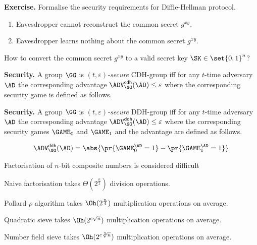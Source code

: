 \documentclass[landscape,footrule]{foils}
\newcommand{\lastline}{\vspace*{-2ex}}
\begin{document}
\textbf{Exercise.} Formalise the security requirements for Diffie-Hellman protocol.

\begin{enumerate}
\item Eavesdropper cannot reconstruct the common secret $g^{xy}$.
\item Eavesdropper learns nothing about the common secret $g^{xy}$.
\end{enumerate}
\bigskip

How to convert the common secret $g^{xy}$ to a valid secret key  $\SK\in\set{0,1}^n$? 
\lastline


\textbf{Security.} A group $\GG$ is \emph{$(t,\varepsilon)$-secure}
CDH-group iff for any $t$-time adversary $\AD$ the corresponding
advantage $\advCDHXX{\GG}{\AD}\leq\varepsilon$ where the corresponding
security game is defined as follows.






\textbf{Security.} A group $\GG$ is \emph{$(t,\varepsilon)$-secure}
DDH-group iff for any $t$-time adversary $\AD$ the corresponding
advantage $\advDDHXX{\GG}{\AD}\leq\varepsilon$ where the corresponding
security games $\GAME_0$ and $\GAME_1$ and the advantage are defined as follows.


\begin{align*}
  \advDDHXX{\GG}{\AD}=\abs{\pr{\GAME_0^\AD=1}-\pr{\GAME_1^\AD=1}}
\end{align*}


Factorisation of $n$-bit composite numbers is considered difficult
\begin{triangles}
  \item Naive factorisation takes $\Theta(2^{\frac{n}{2}})$ division operations.
  \item Pollard $\rho$ algorithm takes $\Oh(2^{\frac{n}{4}})$ multiplication operations on average.
  \item Quadratic sieve  takes $\Oh(2^{c\sqrt{n}})$ multiplication operations on average.
  \item Number field sieve  takes $\Oh(2^{c\sqrt[3]{n}})$ multiplication operations on average.
\end{triangles}
\medskip
\medskip
\end{document}
